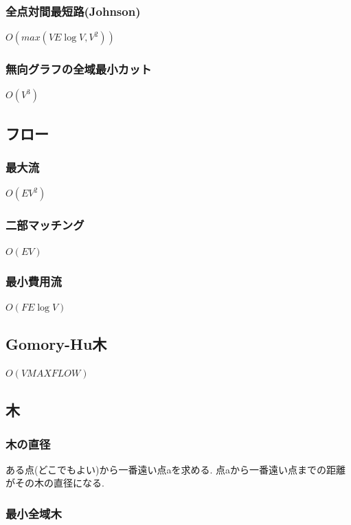 \documentclass[9pt,twocolumn,a4paper,landscape]{extarticle}
\begin{document}
\subsubsection{全点対間最短路(Johnson)}
$O(max(VE\log V, V^2))$

\subsubsection{無向グラフの全域最小カット}
$O(V^3)$


\subsection{フロー}
\subsubsection{最大流}
$O(EV^2)$\par


\subsubsection{二部マッチング}
$O(EV)$\par


\subsubsection{最小費用流}
$O(FE\log V)$\par


\subsection{Gomory-Hu木}
$O(V MAXFLOW)$


\subsection{木}
\subsubsection{木の直径}
ある点(どこでもよい)から一番遠い点aを求める. 点aから一番遠い点までの距離がその木の直径になる.\par
\subsubsection{最小全域木}

\end{document}
